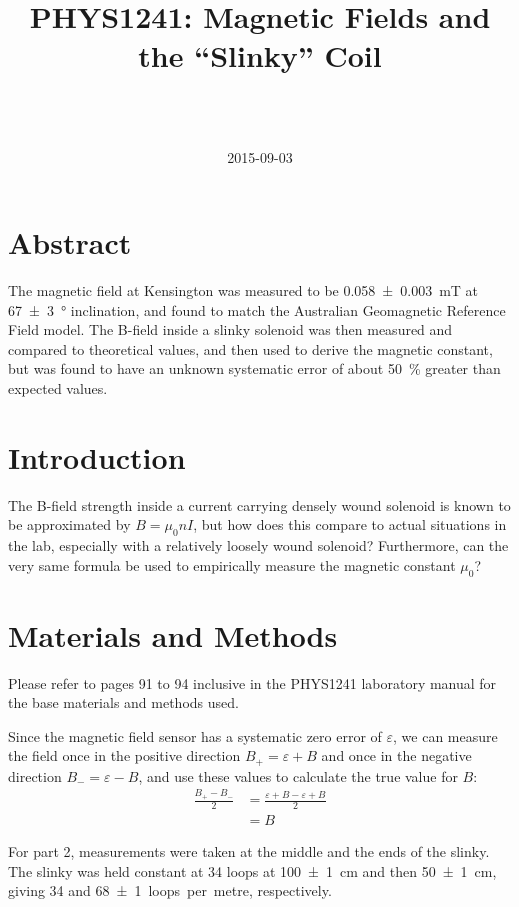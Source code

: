 \documentclass[a4paper]{scrartcl}
\begin{document}
\title{PHYS1241: Magnetic Fields and the ``Slinky'' Coil}
\author{ \\ \\ }
\date{2015-09-03}
\maketitle

\section{Abstract}
The magnetic field at Kensington was measured to be \SI{0.058 \pm 0.003}{\milli\tesla} at \SI{67 \pm 3}{\degree} inclination, and found to match the Australian Geomagnetic Reference Field model. The B-field inside a slinky solenoid was then measured and compared to theoretical values, and then used to derive the magnetic constant, but was found to have an unknown systematic error of about \SI{50}{\percent} greater than expected values.

\section{Introduction}
The B-field strength inside a current carrying densely wound solenoid is known to be approximated by \(B = \mu_0 n I\), but how does this compare to actual situations in the lab, especially with a relatively loosely wound solenoid? Furthermore, can the very same formula be used to empirically measure the magnetic constant \(\mu_0\)?

\section{Materials and Methods}
Please refer to pages 91 to 94 inclusive in the PHYS1241 laboratory manual for the base materials and methods used.

Since the magnetic field sensor has a systematic zero error of \(\varepsilon\), we can measure the field once in the positive direction \(B_+ = \varepsilon + B\) and once in the negative direction \(B_- = \varepsilon - B\), and use these values to calculate the true value for \(B\):
\begin{align*}
    \frac{B_+ - B_-}{2} &= \frac{\varepsilon + B - \varepsilon + B}{2} \\
    &= B
\end{align*}

For part 2, measurements were taken at the middle and the ends of the slinky. The slinky was held constant at 34 loops at \SI{100 \pm 1}{\centi\metre} and then \SI{50 \pm 1}{\centi\metre}, giving \SI{34}{} and \SI{68 \pm 1}{loops per metre}, respectively.
\end{document}
